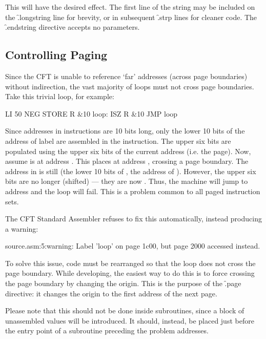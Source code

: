 This will have the desired effect. The first line of the string may be
included on the \f{.longstring} line for brevity, or in subsequent
\f{.strp} lines for cleaner code. The \f{.endstring} directive accepts
no parameters.


\subsection{Controlling Paging}

Since the CFT is unable to reference ‘far’ addresses (across page
boundaries) without indirection, the vast majority of loops must not
cross page boundaries. Take this trivial loop, for example:

\begin{cftasmcode}
        LI 50
        NEG
        STORE R &10
loop:   ISZ R &10
        JMP loop
\end{cftasmcode}

Since addresses in instructions are 10 bits long, only the lower 10 bits of the
address of label  are assembled in the  instruction. The upper
six bits are populated using the upper six bits of the current address
(i.e. the page). Now, assume  is at address . This places
 at address , crossing a page boundary. The address in
 is still  (the lower 10 bits of , the address of
). However, the upper six bits are no longer  (shifted) —
they are now . Thus, the machine will jump to address  and
the loop will fail. This is a problem common to all paged instruction sets.

The CFT Standard Assembler refuses to fix this automatically, instead producing a warning:

\begin{intrcode}
source.asm:5:warning: Label 'loop' on page 1c00,
  but page 2000 accessed instead.
\end{intrcode}

To solve this issue, code must be rearranged so that the loop does not cross
the page boundary. While developing, the easiest way to do this is to force
crossing the page boundary by changing the origin. This is the purpose of the
\f{.page} directive: it changes the origin to the first address of the next
page.

Please note that this should not be done inside subroutines, since a block of
unassembled values will be introduced. It should, instead, be placed just
before the entry point of a subroutine preceding the problem addresses.

